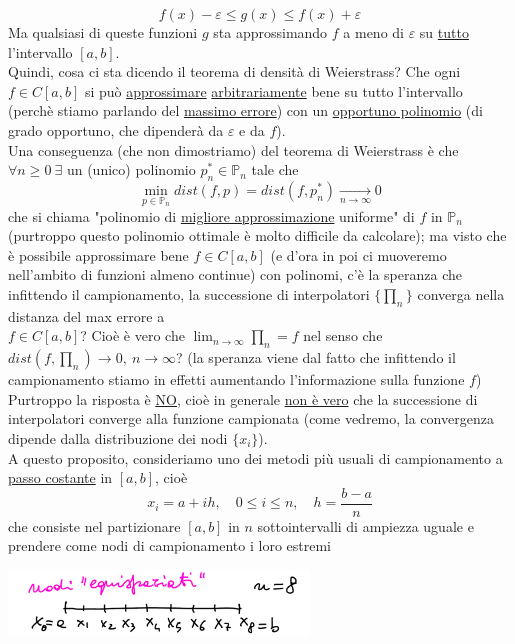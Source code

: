 \documentclass[12pt]{article}
\begin{document}
\[f(x)-\varepsilon \le g(x) \le f(x)+\varepsilon \]
Ma qualsiasi di queste funzioni $g$ sta approssimando $f$ a meno di $\varepsilon$ su \underline{tutto} l'intervallo $[a,b]$.\\
Quindi, cosa ci sta dicendo il teorema di densità di Weierstrass? Che ogni $f \in C[a,b]$ si può \underline{approssimare} \underline{arbitrariamente} bene
su tutto l'intervallo (perchè stiamo parlando del \underline{massimo errore}) con un \underline{opportuno polinomio} (di grado opportuno, che dipenderà da $\varepsilon$ e da $f$).\\
Una conseguenza (che non dimostriamo) del teorema di Weierstrass è che $\forall n\ge0\ \exists$ un (unico) polinomio $p_n^* \in \mathbb{P}_n$ tale che
\[\min_{p \in \mathbb{P}_n} dist(f,p) = dist(f,p_n^*) \underset{n \to \infty}{\longrightarrow} 0\]
che si chiama "polinomio di \underline{migliore approssimazione} uniforme" di $f$ in $\mathbb{P}_n$ (purtroppo questo polinomio ottimale
è molto difficile da calcolare); ma visto che è possibile approssimare bene $f \in C[a,b]$ (e d'ora in poi ci muoveremo nell'ambito di funzioni almeno continue) con polinomi, c'è la speranza che infittendo il campionamento, la successione di interpolatori $\{\prod_n\}$ converga nella distanza del max errore a \\$f \in C[a,b]$? Cioè è vero che $\lim_{n \to \infty} \prod_n = f$ nel senso che $dist(f,\prod_n) \to 0,\ n \to \infty$? (la speranza viene dal fatto che infittendo il campionamento stiamo
in effetti aumentando l'informazione sulla funzione $f$)\\
Purtroppo la risposta è \underline{\underline{NO}}, cioè in generale \underline{non è vero} che la successione di interpolatori converge alla funzione campionata (come vedremo, la convergenza dipende dalla distribuzione dei nodi $\{x_i\}$).\\
A questo proposito, consideriamo uno dei metodi più usuali di campionamento a \underline{passo costante} in $[a,b]$, cioè
\[x_i = a+ih, \quad 0\le i \le n, \quad h = \frac{b-a}{n}\]
che consiste nel partizionare $[a,b]$ in $n$ sottointervalli di ampiezza uguale e prendere come nodi di campionamento i loro estremi
\begin{center}
    \includegraphics[width=0.6\textwidth]{pag37.PNG}
\end{center}
\end{document}
